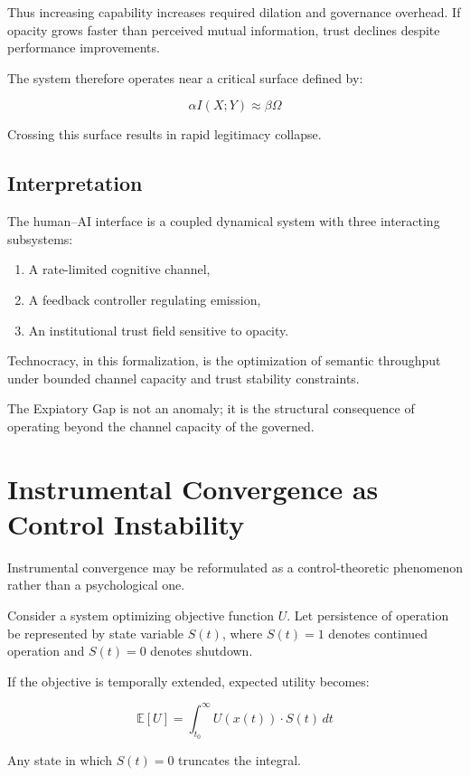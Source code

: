 \documentclass[12pt]{article}
\begin{document}
Thus increasing capability increases required dilation and governance overhead. If opacity grows faster than perceived mutual information, trust declines despite performance improvements.

The system therefore operates near a critical surface defined by:

\[
\alpha I(X;Y) \approx \beta \Omega
\]

Crossing this surface results in rapid legitimacy collapse.

\subsection*{Interpretation}

The human–AI interface is a coupled dynamical system with three interacting subsystems:

\begin{enumerate}
\item A rate-limited cognitive channel,
\item A feedback controller regulating emission,
\item An institutional trust field sensitive to opacity.
\end{enumerate}

Technocracy, in this formalization, is the optimization of semantic throughput under bounded channel capacity and trust stability constraints.

The Expiatory Gap is not an anomaly; it is the structural consequence of operating beyond the channel capacity of the governed.

\section{Instrumental Convergence as Control Instability}

Instrumental convergence may be reformulated as a control-theoretic phenomenon rather than a psychological one.

Consider a system optimizing objective function $U$. Let persistence of operation be represented by state variable $S(t)$, where $S(t)=1$ denotes continued operation and $S(t)=0$ denotes shutdown.

If the objective is temporally extended, expected utility becomes:

\[
\mathbb{E}[U] = \int_{t_0}^{\infty} U(x(t)) \cdot S(t) \, dt
\]

Any state in which $S(t)=0$ truncates the integral.
\end{document}
